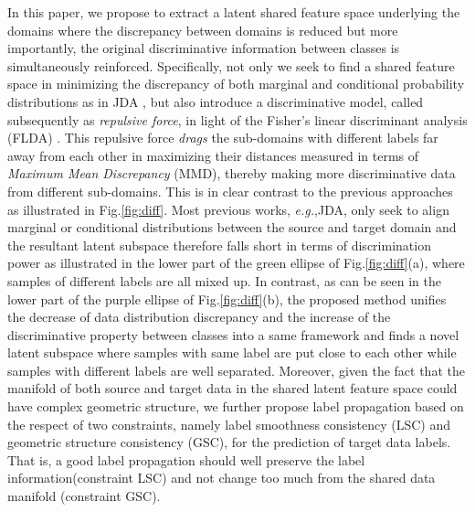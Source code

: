 \documentclass[10pt,twocolumn,letterpaper]{article}
\begin{document}
\begin{CJK*}{UTF8}{gkai}
In this paper, we propose to extract a latent shared feature space underlying the domains where the discrepancy between domains is reduced but more importantly, the original discriminative information between classes is simultaneously reinforced. Specifically, not only we seek to find a shared feature space in minimizing the discrepancy of both marginal and conditional probability distributions as in JDA \cite{long2013transfer},  but also introduce a discriminative model, called subsequently as \textit{repulsive force}, in light of the  Fisher’s linear discriminant analysis (FLDA) \cite{fisher1936use}. This repulsive force \emph{drags} the sub-domains with different labels far away from each other in maximizing their distances measured in terms of \textit{Maximum Mean Discrepancy} (MMD), thereby making more discriminative  data from different sub-domains. This is in clear contrast to the previous approaches as illustrated in Fig.\ref{fig:diff}. Most previous works, \textit{e.g.},JDA, only seek to align marginal or conditional distributions between the source and target domain and the resultant latent subspace therefore falls short in terms of discrimination power as illustrated in the lower part of the green ellipse of Fig.\ref{fig:diff}(a), where samples of different labels are all mixed up.  In contrast, as can be seen in the lower part of the purple ellipse of Fig.\ref{fig:diff}(b), the proposed method unifies the decrease of data distribution discrepancy and the increase of the discriminative property between classes into a same framework and finds a novel latent subspace where samples with same label are put close to each other while samples with different labels are well separated. Moreover, given the fact that the manifold of both source and target data in the shared latent feature space could have complex geometric structure, we further propose label propagation based on the respect of two constraints, namely label smoothness consistency (LSC) and geometric structure consistency (GSC), for the prediction of target data labels. That is, a good label propagation should well preserve the label information(constraint LSC) and not change too much from the shared data manifold (constraint GSC).


\end{CJK*}
\end{document}
